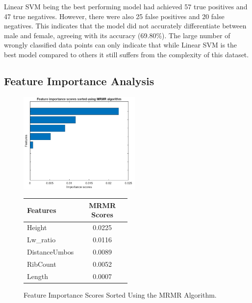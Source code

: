 Linear SVM being the best performing model had achieved 57 true positives and 47 true negatives. However, there were also 25 false positives and 20 false negatives. This indicates that the model did not accurately differentiate  between male and female, agreeing with its accuracy (69.80\%). The large number of wrongly classified data points can only indicate that while Linear SVM is the best model compared to others it still suffers from the complexity of this dataset. 

\newpage
\subsection{Feature Importance Analysis}

\begin{figure}[!htbp]
	\centering
	\begin{minipage}{0.48\textwidth} 
		\centering
		\includegraphics[width=\textwidth, height=5cm]{figures/mrmr.png} 
	\end{minipage}%
	\hfill 
	\begin{minipage}{0.48\textwidth} 
		\centering
		{\fontsize{12}{15}\selectfont 
			\begin{tabular}{p{0.5\linewidth}c}
				\hline
				\textbf{Features} & \textbf{MRMR Scores} \\ \hline
				Height              & 0.0225  \\
				Lw\_ratio           & 0.0116  \\
				DistanceUmbos       & 0.0089  \\
				RibCount            & 0.0052  \\
				Length              & 0.0007  \\
				\hline
			\end{tabular}
		}
	\end{minipage}
	\caption{Feature Importance Scores Sorted Using the MRMR Algorithm.}
	\label{fig:mrmr-combined}
\end{figure}

